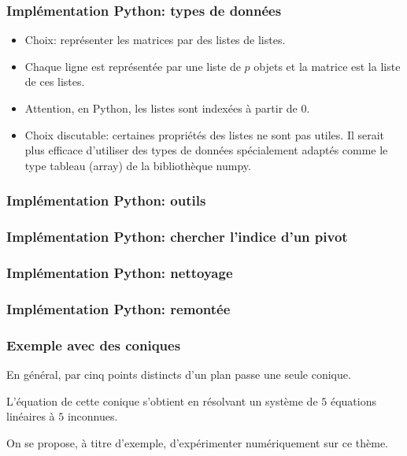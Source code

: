 \begin{frame}
  \frametitle{Implémentation Python: types de données}
\begin{itemize}
  \item Choix: représenter les matrices par des listes de listes.
  \item Chaque ligne est représentée par une liste de $p$ objets et la matrice est la liste de ces listes.
  \item Attention, en Python, les listes sont indexées à partir de $0$.
  \item Choix discutable: certaines propriétés des listes ne sont pas utiles. Il serait plus efficace d'utiliser des types de données spécialement adaptés comme le type tableau (array) de la bibliothèque numpy.
\end{itemize} 
\end{frame}

\begin{frame}
  \frametitle{Implémentation Python: outils}

\end{frame}

\begin{frame}
  \frametitle{Implémentation Python: chercher l'indice d'un pivot}

\end{frame}

\begin{frame}
  \frametitle{Implémentation Python: nettoyage}

\end{frame}

\begin{frame}
  \frametitle{Implémentation Python: remontée}

\end{frame}

\begin{frame}
  \frametitle{Exemple avec des coniques}
En général, par cinq points distincts d'un plan passe une seule conique.

L'équation de cette conique s'obtient en résolvant un système de $5$  équations linéaires à $5$ inconnues.

On se propose, à titre d'exemple, d'expérimenter numériquement sur ce thème.

\end{frame}

